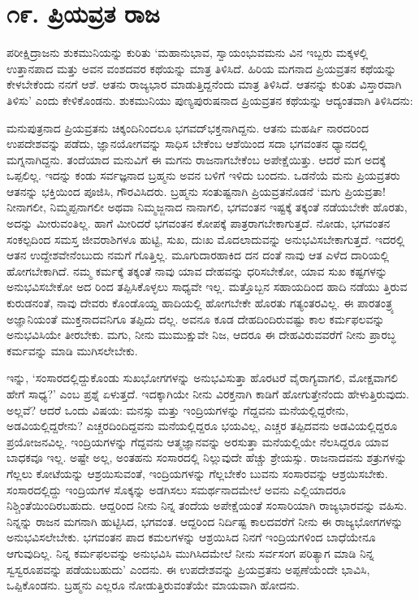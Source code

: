 
\chapter{೧೯. ಪ್ರಿಯವ್ರತ ರಾಜ}

ಪರೀಕ್ಷಿದ್ರಾಜನು ಶುಕಮುನಿಯನ್ನು ಕುರಿತು ‘ಮಹಾನುಭಾವ, ಸ್ವಾಯಂಭುವಮನು ವಿನ ಇಬ್ಬರು ಮಕ್ಕಳಲ್ಲಿ ಉತ್ತಾನಪಾದ ಮತ್ತು ಅವನ ವಂಶದವರ ಕಥೆಯನ್ನು ಮಾತ್ರ ತಿಳಿಸಿದೆ. ಹಿರಿಯ ಮಗನಾದ ಪ್ರಿಯವ್ರತನ ಕಥೆಯನ್ನು ಕೇಳಬೇಕೆಂದು ನನಗೆ ಆಶೆ. ಆತನು ರಾಜ್ಯಭಾರ ಮಾಡುತ್ತಿದ್ದನೆಂದು ಮಾತ್ರ ತಿಳಿಸಿದೆ. ಆತನನ್ನು ಕುರಿತು ವಿಸ್ತಾರವಾಗಿ ತಿಳಿಸು’ ಎಂದು ಕೇಳಿಕೊಂಡನು. ಶುಕಮುನಿಯು ಪುಣ್ಯಪುರುಷನಾದ ಪ್ರಿಯವ್ರತನ ಕಥೆಯನ್ನು ಆದ್ಯಂತವಾಗಿ ತಿಳಿಸಿದನು:

ಮನುಪುತ್ರನಾದ ಪ್ರಿಯವ್ರತನು ಚಿಕ್ಕಂದಿನಿಂದಲೂ ಭಗವದ್​ಭಕ್ತನಾಗಿದ್ದನು. ಆತನು ಮಹರ್ಷಿ ನಾರದರಿಂದ ಉಪದೇಶವನ್ನು ಪಡೆದು, ಜ್ಞಾನಯೋಗವನ್ನು ಸಾಧಿಸ ಬೇಕೆಂಬ ಆಶೆಯಿಂದ ಸದಾ ಭಗವಂತನ ಧ್ಯಾನದಲ್ಲಿ ಮಗ್ನನಾಗಿದ್ದನು. ತಂದೆಯಾದ ಮನುವಿಗೆ ಈ ಮಗನು ರಾಜನಾಗಬೇಕೆಂಬ ಅಪೇಕ್ಷೆಯಿತ್ತು. ಆದರೆ ಮಗ ಅದಕ್ಕೆ ಒಪ್ಪಲಿಲ್ಲ. ಇದನ್ನು ಕಂಡು ಸರ್ವಜ್ಞನಾದ ಬ್ರಹ್ಮನು ಅವನ ಬಳಿಗೆ ಇಳಿದು ಬಂದನು. ಒಡನೆಯೆ ಮನು ಪ್ರಿಯವ್ರತರು ಆತನನ್ನು ಭಕ್ತಿಯಿಂದ ಪೂಜಿಸಿ, ಗೌರವಿಸಿದರು. ಬ್ರಹ್ಮನು ಸಂತುಷ್ಟನಾಗಿ ಪ್ರಿಯವ್ರತನೊಡನೆ ‘ಮಗು ಪ್ರಿಯವ್ರತಾ! ನೀನಾಗಲೀ, ನಿಮ್ಮಪ್ಪನಾಗಲೀ ಅಥವಾ ನಿಮ್ಮಜ್ಜನಾದ ನಾನಾಗಲಿ, ಭಗವಂತನ ಇಷ್ಟಕ್ಕೆ ತಕ್ಕಂತೆ ನಡೆಯಬೇಕೇ ಹೊರತು, ಅದನ್ನು ಮೀರುವಂತಿಲ್ಲ. ಹಾಗೆ ಮೀರಿದರೆ ಭಗವಂತನ ಕೋಪಕ್ಕೆ ಪಾತ್ರರಾಗಬೇಕಾಗುತ್ತದೆ. ನೋಡು, ಭಗವಂತನ ಸಂಕಲ್ಪದಿಂದ ಸಮಸ್ತ ಜೀವರಾಶಿಗಳೂ ಹುಟ್ಟಿ, ಸುಖ, ದುಃಖ ಮೊದಲಾದುವನ್ನು ಅನುಭವಿಸಬೇಕಾಗುತ್ತದೆ. ಇದರಲ್ಲಿ ಆತನ ಉದ್ದೇಶವೇನೆಂಬುದು ನಮಗೆ ಗೊತ್ತಿಲ್ಲ. ಮೂಗುದಾರಹಾಕಿದ ದನ ದಂತೆ ನಾವು ಆತ ಎಳೆದ ದಾರಿಯಲ್ಲಿ ಹೋಗಬೇಕಾಗಿದೆ. ನಮ್ಮ ಕರ್ಮಕ್ಕೆ ತಕ್ಕಂತೆ ನಾವು ಯಾವ ದೇಹವನ್ನು ಧರಿಸಬೇಕೋ, ಯಾವ ಸುಖ ಕಷ್ಟಗಳನ್ನು ಅನುಭವಿಸಬೇಕೋ ಅದ ರಿಂದ ತಪ್ಪಿಸಿಕೊಳ್ಳಲು ಸಾಧ್ಯವೇ ಇಲ್ಲ. ಮತ್ತೊಬ್ಬನ ಸಹಾಯದಿಂದ ಹಾದಿ ನಡೆಯು ತ್ತಿರುವ ಕುರುಡನಂತೆ, ನಾವು ದೇವರು ಕೊಂಡೊಯ್ದ ಹಾದಿಯಲ್ಲಿ ಹೋಗಬೇಕೇ ಹೊರತು ಗತ್ಯಂತರವಿಲ್ಲ. ಈ ಪಾರತಂತ್ರ್ಯ ಅಜ್ಞಾನಿಯಂತೆ ಮುಕ್ತನಾದವನಿಗೂ ತಪ್ಪಿದು ದಲ್ಲ. ಅವನೂ ಕೂಡ ದೇಹದಿಂದಿರುವಷ್ಟು ಕಾಲ ಕರ್ಮಫಲವನ್ನು ಅನುಭವಿಸಿಯೇ ತೀರಬೇಕು. ಮಗು, ನೀನು ಮುಮುಕ್ಷುವೇ ನಿಜ, ಆದರೂ ಈ ದೇಹವಿರುವವರೆಗೆ ನೀನು ಪ್ರಾರಬ್ಧ ಕರ್ಮವನ್ನು ಮಾಡಿ ಮುಗಿಸಲೇಬೇಕು.

ಇನ್ನು, ‘ಸಂಸಾರದಲ್ಲಿದ್ದುಕೊಂಡು ಸುಖಭೋಗಗಳನ್ನು ಅನುಭವಿಸುತ್ತಾ ಹೊರಟರೆ ವೈರಾಗ್ಯವಾಗಲಿ, ಮೋಕ್ಷವಾಗಲಿ ಹೇಗೆ ಸಾಧ್ಯ?’ ಎಂಬ ಪ್ರಶ್ನೆ ಏಳುತ್ತದೆ. ಇದಕ್ಕಾಗಿಯೇ ನೀನು ವಿರಕ್ತನಾಗಿ ಕಾಡಿಗೆ ಹೋಗುತ್ತೇನೆಂದು ಹೇಳುತ್ತಿರುವುದು. ಅಲ್ಲವೆ? ಆದರೆ ಒಂದು ವಿಷಯ: ಮನಸ್ಸು ಮತ್ತು ಇಂದ್ರಿಯಗಳನ್ನು ಗೆದ್ದವನು ಮನೆಯಲ್ಲಿದ್ದರೇನು, ಅಡವಿಯಲ್ಲಿದ್ದರೇನು? ಎಚ್ಚರದಿಂದಿದ್ದವನು ಮನೆಯಲ್ಲಿದ್ದರೂ ಭಯವಿಲ್ಲ, ಎಚ್ಚರ ತಪ್ಪಿದವನು ಅಡವಿಯಲ್ಲಿದ್ದರೂ ಪ್ರಯೋಜನವಿಲ್ಲ. ಇಂದ್ರಿಯಗಳನ್ನು ಗೆದ್ದವನು ಆತ್ಮಜ್ಞಾನವನ್ನು ಅರಸುತ್ತಾ ಮನೆಯಲ್ಲಿಯೇ ನೆಲಸಿದ್ದರೂ ಯಾವ ಬಾಧಕವೂ ಇಲ್ಲ. ಅಷ್ಟೇ ಅಲ್ಲ, ಅಂತಹನು ಸಂಸಾರದಲ್ಲಿ ನಿಲ್ಲುವುದೇ ಹೆಚ್ಚು ಶ್ರೇಯಸ್ಸು. ರಾಜನಾದವನು ಶತ್ರುಗಳನ್ನು ಗೆಲ್ಲಲು ಕೋಟೆಯನ್ನು ಆಶ್ರಯಿಸುವಂತೆ, ಇಂದ್ರಿಯಗಳನ್ನು ಗೆಲ್ಲಬೇಕೆಂ ಬುವನು ಸಂಸಾರವನ್ನು ಆಶ್ರಯಿಸಬೇಕು. ಸಂಸಾರದಲ್ಲಿದ್ದು ಇಂದ್ರಿಯಗಳ ಸೊಕ್ಕನ್ನು ಅಡಗಿಸಲು ಸಮರ್ಥನಾದಮೇಲೆ ಅವನು ಎಲ್ಲಿಯಾದರೂ ನಿಶ್ಚಿಂತೆಯಿಂದಿರಬಹುದು. ಆದ್ದರಿಂದ ನೀನು ನಿನ್ನ ತಂದೆಯ ಅಪೇಕ್ಷೆಯಂತೆ ಸಂಸಾರಿಯಾಗಿ ರಾಜ್ಯಭಾರವನ್ನು ವಹಿಸು. ನಿನ್ನನ್ನು ರಾಜನ ಮಗನಾಗಿ ಹುಟ್ಟಿಸಿದ, ಭಗವಂತ. ಆದ್ದರಿಂದ ನಿರ್ದಿಷ್ಟ ಕಾಲದವರೆಗೆ ನೀನು ಈ ರಾಜ್ಯಭೋಗಗಳನ್ನು ಅನುಭವಿಸಲೇಬೇಕು. ಭಗವಂತನ ಪಾದ ಕಮಲಗಳನ್ನು ಆಶ್ರಯಿಸಿದ ನಿನಗೆ ಇಂದ್ರಿಯಗಳಿಂದ ಬಾಧೆಯೇನೂ ಆಗುವುದಿಲ್ಲ. ನಿನ್ನ ಕರ್ಮಫಲವನ್ನು ಅನುಭವಿಸಿ ಮುಗಿಸಿದಮೇಲೆ ನೀನು ಸರ್ವಸಂಗ ಪರಿತ್ಯಾಗ ಮಾಡಿ ನಿನ್ನ ಸ್ವಸ್ವರೂಪವನ್ನು ಪಡೆಯಬಹುದು’ ಎಂದನು. ಈ ಉಪದೇಶವನ್ನು ಪ್ರಿಯವ್ರತನು ಅಪ್ಪಣೆಯೆಂದೇ ಭಾವಿಸಿ, ಒಪ್ಪಿಕೊಂಡನು. ಬ್ರಹ್ಮನು ಎಲ್ಲರೂ ನೋಡುತ್ತಿರುವಂತೆಯೇ ಮಾಯವಾಗಿ ಹೋದನು.

